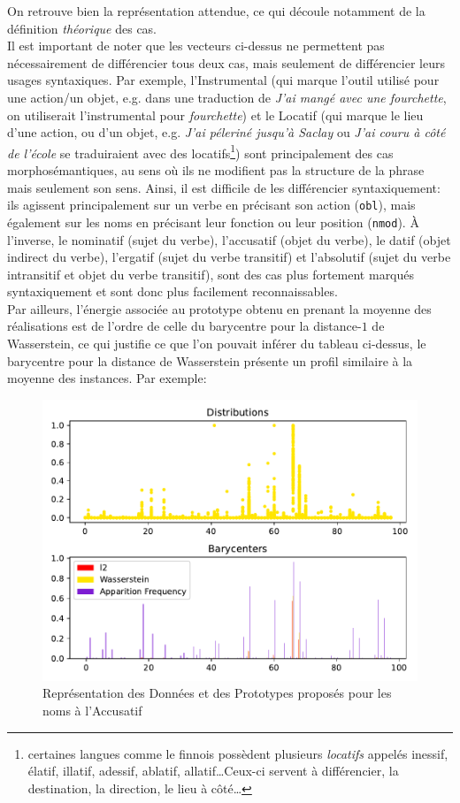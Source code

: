 \documentclass{cours}
\begin{document}
On retrouve bien la représentation attendue, ce qui découle notamment de la définition \emph{théorique} des cas. \\
Il est important de noter que les vecteurs ci-dessus ne permettent pas nécessairement de différencier tous deux cas, mais seulement de différencier leurs usages syntaxiques.
Par exemple, l'Instrumental (qui marque l'outil utilisé pour une action/un objet, e.g. dans une traduction de \textsl{J'ai mangé \emph{avec} une fourchette}, on utiliserait l'instrumental pour \textsl{fourchette})
et le Locatif (qui marque le lieu d'une action, ou d'un objet, e.g. \textsl{J'ai péleriné jusqu'à Saclay} ou \textsl{J'ai couru à côté de l'école} se traduiraient avec des locatifs\footnote{certaines langues comme le finnois possèdent plusieurs \textit{locatifs} appelés inessif, élatif, illatif, adessif, ablatif, allatif\ldots Ceux-ci servent à différencier, la destination, la direction, le lieu à côté\ldots}) sont principalement des cas morphosémantiques, au sens où ils ne modifient pas la structure de la phrase mais seulement son sens.
Ainsi, il est difficile de les différencier syntaxiquement: ils agissent principalement sur un verbe en précisant son action (\texttt{obl}), mais également sur les noms en précisant leur fonction ou leur position (\texttt{nmod}).
À l'inverse, le nominatif (sujet du verbe), l'accusatif (objet du verbe), le datif (objet indirect du verbe), l'ergatif (sujet du verbe transitif) et l'absolutif (sujet du verbe intransitif et objet du verbe transitif), sont des cas plus fortement marqués syntaxiquement et sont donc plus facilement reconnaissables.\\

\medskip
Par ailleurs, l'énergie associée au prototype obtenu en prenant la moyenne des réalisations est de l'ordre de celle du barycentre pour la distance-$1$ de Wasserstein, ce qui justifie ce que l'on pouvait inférer du tableau ci-dessus, le barycentre pour la distance de Wasserstein présente un profil similaire à la moyenne des instances.
Par exemple:

\begin{figure}[H]
\centering
\includegraphics{Figures/Visualisations/Nouns_Wasserstein_Barycenter_Acc}
\caption{Représentation des Données et des Prototypes proposés pour les noms à l'Accusatif}
\end{figure}
\end{document}
